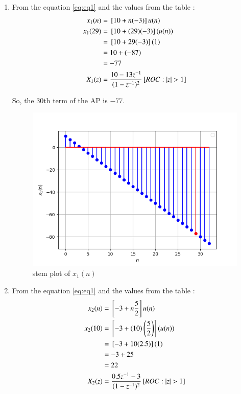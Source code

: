 \documentclass[journal,12pt,twocolumn]{IEEEtran}
\theoremstyle{remark}
\begin{document}
\begin{enumerate}
\item From the equation \eqref{eq:eq1} and the values from the table  :
\begin{align}
x_1(n) &= {}\left[10 + n(-3)\right]u(n)\\
x_1(29) &= {}\left[10 + (29)(-3)\right](u(n))\\
&= {}\left[10 + 29(-3)\right](1)\\
&= 10+ (-87)  \\
&= -77\\
X_1(z) &= \frac{10 - 13z^{-1}}{(1-z^{-1})^2} {}\left[ROC : |z| > 1\right]
\end{align}

So, the 30th term of the AP is $-77$.\\
\begin{figure}[h!]
    \centering
    \includegraphics[width=\columnwidth]{figs/plot1.png}
    \caption{stem plot of $x_1(n)$}
    \label{fig:1}
\end{figure}

\item From the equation \eqref{eq:eq1} and the values from the table  :
\begin{align}
x_2(n) &= {}\left[-3 + n\frac{5}{2}\right]u(n)\\
x_2(10) &= {}\left[-3 + (10)\left(\frac{5}{2}\right)\right](u(n))\\
&= {}\left[-3 + 10(2.5)\right](1)\\
& = -3 + 25 \\
&= 22\\
X_2(z) &= \frac{0.5z^{-1}-3}{(1-z^{-1})^2} {}\left[ROC : |z| > 1\right]
\end{align}



\end{enumerate}
\end{document}
